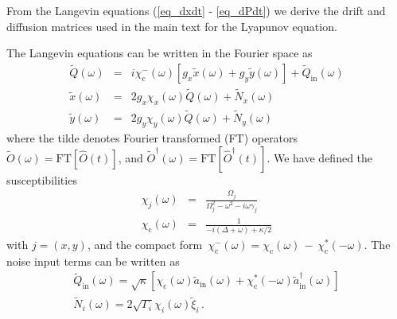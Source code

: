 \documentclass[11pt,floatfix,amssymb,prx,aps,longbibliography,superscriptaddress,nopacs]{revtex4-2}
\newcommand{\om}{\left( \omega \right)}
\newcommand{\tQo}{\tilde{Q}\left(\omega\right)}
\newcommand{\txo}{\tilde{x}\left(\omega\right)}
\newcommand{\tyo}{\tilde{y}\left(\omega\right)}
\newcommand{\tNx}{\tilde{N}_x\left(\omega\right)}
\newcommand{\tNy}{\tilde{N}_y\left(\omega\right)}
\newcommand{\tNi}{\tilde{N}_i\left(\omega\right)}
\newcommand{\ccm}{\chi_\mathrm{c}^-\left(\omega\right)}
\newcommand{\cxm}{\chi_x\left(\omega\right)}
\newcommand{\cym}{\chi_y\left(\omega\right)}
\newcommand{\OmegaX}{\Omega_{\scriptstyle{x}}}
\newcommand{\OmegaY}{\Omega_{\scriptstyle{y}}}
\newcommand{\GY}{\Gamma_{\scriptstyle{y}}}
\newcommand{\GX}{\Gamma_{\scriptstyle{x}}}
\newcommand{\gX}{g_{\scriptstyle{x}}}
\newcommand{\gY}{g_{\scriptstyle{y}}}
\begin{document}
From the Langevin equations (\ref{eq_dxdt} - \ref{eq_dPdt}) we derive the drift and diffusion matrices used in the main text for the Lyapunov equation.

The Langevin equations can be written in the Fourier space as
\begin{eqnarray}
\tQo &=& i \ccm \left[g_x \txo+g_y \tyo  \right]+\tilde{Q}_\mathrm{in} \left(\omega\right)
\label{eq_Lang1} \\
\txo &=&  2  \gX \cxm \tQo + \tNx 
\label{eq_Lang2} \\
\tyo &=& 2  \gY \cym \tQo + \tNy 
\label{eq_Lang3}
\end{eqnarray}
where the tilde denotes Fourier transformed (FT) operators $\tilde{O}\left(\omega\right)=\mathrm{FT}\left[\hat{O}\left(t\right)\right]$, and
$\tilde{O}^{\dagger}\left(\omega\right)=\mathrm{FT}\left[\hat{O}^{\dagger}\left(t\right)\right]$.
We have defined the susceptibilities
\begin{eqnarray}
\chi_j\left(\omega\right) &=& \frac{\Omega_j}{\Omega_j^2-\omega^2-i\omega\gamma_j}\\
\chi_\mathrm{c}\left(\omega\right) &=& \frac{1}{-i
\left(\Delta+\omega\right)+\kappa/2}
\end{eqnarray}
with $j= (x, y)$, and the compact form
$\,\ccm=\chi_\mathrm{c}\left(\omega\right) \,-\,
\chi_\mathrm{c}^{*}\left(-\omega\right)$.
The noise input terms can be written as
\begin{gather}
\tilde{Q}_\mathrm{in} \left(\omega\right) = \sqrt{\kappa}\left[\chi_\mathrm{c} \om \tilde{a}_{\mathrm{in}}\om +
\chi_\mathrm{c}^{*} \left(- \omega\right) \tilde{a}^{\dagger}_{\mathrm{in}}\left(  \omega \right)  \right]\\
\tNi=2 \sqrt{\Gamma_i} \chi_i\om \tilde{\xi}_i   \, .
\end{gather}
\end{document}
